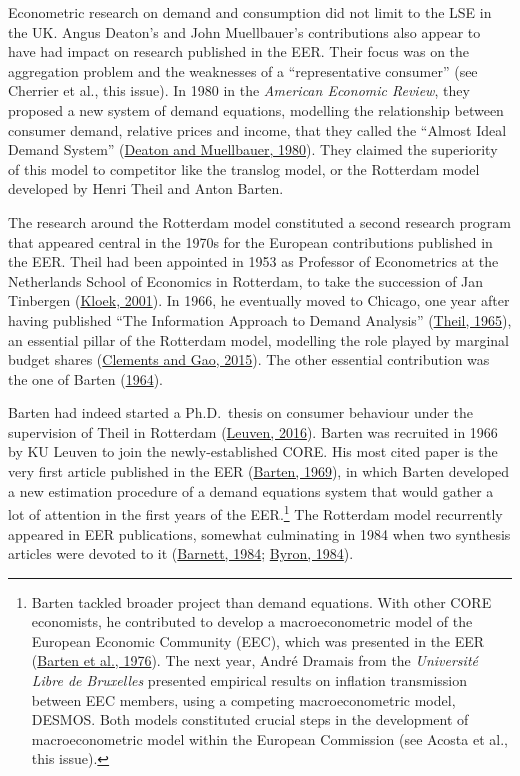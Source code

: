 \documentclass[
  12pt,
  onecolumn]{article}
\begin{document}
Econometric research on demand and consumption did not limit to the LSE
in the UK. Angus Deaton's and John Muellbauer's contributions also
appear to have had impact on research published in the EER. Their focus
was on the aggregation problem and the weaknesses of a ``representative
consumer'' (see Cherrier et al., this issue). In 1980 in the
\emph{American Economic Review}, they proposed a new system of demand
equations, modelling the relationship between consumer demand, relative
prices and income, that they called the ``Almost Ideal Demand System''
(\protect\hyperlink{ref-deaton1980}{Deaton and Muellbauer, 1980}). They
claimed the superiority of this model to competitor like the translog
model, or the Rotterdam model developed by Henri Theil and Anton Barten.

The research around the Rotterdam model constituted a second research
program that appeared central in the 1970s for the European
contributions published in the EER. Theil had been appointed in 1953 as
Professor of Econometrics at the Netherlands School of Economics in
Rotterdam, to take the succession of Jan Tinbergen
(\protect\hyperlink{ref-kloek2001}{Kloek, 2001}). In 1966, he eventually
moved to Chicago, one year after having published ``The Information
Approach to Demand Analysis'' (\protect\hyperlink{ref-theil1965}{Theil,
1965}), an essential pillar of the Rotterdam model, modelling the role
played by marginal budget shares
(\protect\hyperlink{ref-clements2015a}{Clements and Gao, 2015}). The
other essential contribution was the one of Barten
(\protect\hyperlink{ref-barten1964}{1964}).

Barten had indeed started a Ph.D.~thesis on consumer behaviour under the
supervision of Theil in Rotterdam
(\protect\hyperlink{ref-kuleuven2016}{Leuven, 2016}). Barten was
recruited in 1966 by KU Leuven to join the newly-established CORE. His
most cited paper is the very first article published in the EER
(\protect\hyperlink{ref-barten1969}{Barten, 1969}), in which Barten
developed a new estimation procedure of a demand equations system that
would gather a lot of attention in the first years of the
EER.\footnote{Barten tackled broader project than demand equations. With
  other CORE economists, he contributed to develop a macroeconometric
  model of the European Economic Community (EEC), which was presented in
  the EER (\protect\hyperlink{ref-barten1976}{Barten et al., 1976}). The
  next year, André Dramais from the \emph{Université Libre de Bruxelles}
  presented empirical results on inflation transmission between EEC
  members, using a competing macroeconometric model, DESMOS. Both models
  constituted crucial steps in the development of macroeconometric model
  within the European Commission (see Acosta et al., this issue).} The
Rotterdam model recurrently appeared in EER publications, somewhat
culminating in 1984 when two synthesis articles were devoted to it
(\protect\hyperlink{ref-barnett1984}{Barnett, 1984};
\protect\hyperlink{ref-byron1984}{Byron, 1984}).
\end{document}
